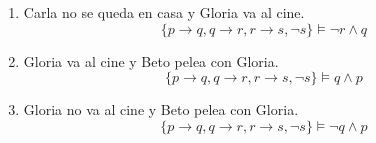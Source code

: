\documentclass{article}
\begin{document}
\begin{enumerate}
\begin{enumerate}
\begin{prooftree}
        		\end{prooftree}
                
		    \item Carla no se queda en casa y Gloria va al cine.
		        \begin{equation}
                    \{ p  \to q, q \to r, r \to s, \neg s
                    \} \models \neg r \land q
                \end{equation}
                
                \begin{prooftree}
        		    
        		\end{prooftree}
		    \item Gloria va al cine y Beto pelea con Gloria.
		        \begin{equation}
                    \{  p  \to q, q \to r, r \to s, \neg s
                    \} \models q \land p
                \end{equation}
                \begin{prooftree}
        		\end{prooftree}
		    \item Gloria no va al cine y Beto pelea con Gloria.
		        \begin{equation}
                    \{ p  \to q, q \to r, r \to s, \neg s
                    \} \models \neg q \land  p
                \end{equation}
                \begin{prooftree}
        		\end{prooftree}
		    \end{enumerate}
		    

\end{enumerate}
\end{document}
